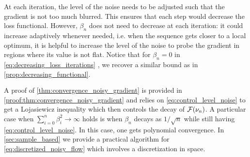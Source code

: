 \begin{remark}
	At each iteration, the level of the noise needs to be adjusted such that the gradient is not too much blurred. This ensures that each step would decrease the loss functional. However, $\beta_n$ does not need to decrease at each iteration: it could increase adaptively whenever needed, i.e. when  the sequence gets closer to a local optimum, it is helpful to increase the level of the noise to probe the gradient in regions where its value is not flat.
	Notice that for $\beta_n = 0$  in \cref{eq:decreasing_loss_iterations} , we recover a similar bound as in \cref{prop:decreasing_functional}. %
 \end{remark}
A proof of \cref{thm:convergence_noisy_gradient} is provided in \cref{proof:thm:convergence_noisy_gradient} and relies on \cref{eq:control_level_noise} to get a Lojasiewicz inequality which then controls the decay of ${{\mathcal F}}(\nu_n)$. A particular case when $\sum_{i=0}^n \beta_i^2 \rightarrow \infty$ holds is when $\beta_n$ decays as $1/\sqrt{n}$ while still having \cref{eq:control_level_noise}. In this case, one gets polynomial convergence.
In \cref{sec:sample_based} we provide a practical algorithm for \cref{eq:discretized_noisy_flow} which involves a discretization in space.
 
 
 
